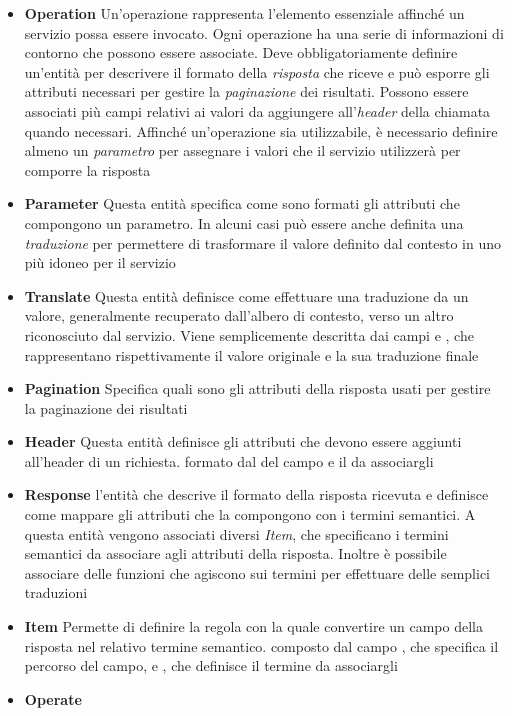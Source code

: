 \begin{itemize}
	\item \textbf{Operation}
	Un'operazione rappresenta l'elemento essenziale affinché un servizio possa essere invocato. Ogni operazione ha una serie di informazioni di contorno che possono essere associate. Deve obbligatoriamente definire un'entità per descrivere il formato della \emph{risposta} che riceve e può esporre gli attributi necessari per gestire la \emph{paginazione} dei risultati. Possono essere associati più campi relativi ai valori da aggiungere all'\emph{header} della chiamata quando necessari. Affinché un'operazione sia utilizzabile, è necessario definire almeno un \emph{parametro} per assegnare i valori che il servizio utilizzerà per comporre la risposta
	\item \textbf{Parameter}
	Questa entità specifica come sono formati gli attributi che compongono un parametro. In alcuni casi può essere anche definita una \emph{traduzione} per permettere di trasformare il valore definito dal contesto in uno più idoneo per il servizio
	\item \textbf{Translate}
	Questa entità definisce come effettuare una traduzione da un valore, generalmente recuperato dall'albero di contesto, verso un altro riconosciuto dal servizio. Viene semplicemente descritta dai campi  e , che rappresentano rispettivamente il valore originale e la sua traduzione finale
	\item \textbf{Pagination}
	Specifica quali sono gli attributi della risposta usati per gestire la paginazione dei risultati
	\item \textbf{Header}
	Questa entità definisce gli attributi che devono essere aggiunti all'header di un richiesta. \upe formato dal  del campo e il  da associargli
	\item \textbf{Response}
	\upe l'entità che descrive il formato della risposta ricevuta e definisce come mappare gli attributi che la compongono con i termini semantici. A questa entità vengono associati diversi \emph{Item}, che specificano i termini semantici da associare agli attributi della risposta. Inoltre è possibile associare delle funzioni che agiscono sui termini per effettuare delle semplici traduzioni 
	\item \textbf{Item}
	Permette di definire la regola con la quale convertire un campo della risposta nel relativo termine semantico. \upe composto dal campo , che specifica il percorso del campo, e , che definisce il termine da associargli
	\item \textbf{Operate}

\end{itemize}
